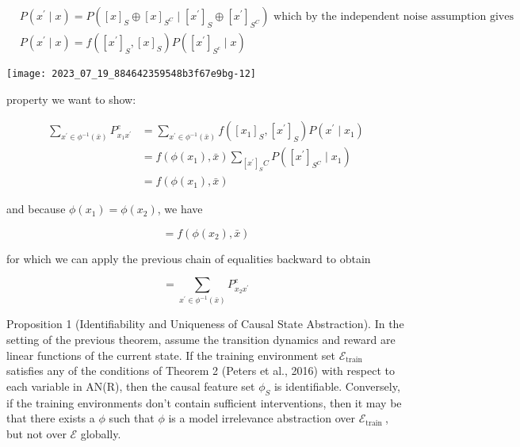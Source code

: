 \documentclass[10pt]{article}
\begin{document}
\[
\begin{aligned}
& P\left(x^{\prime} \mid x\right)=P\left([x]_{S} \oplus[x]_{S^{C}} \mid\left[x^{\prime}\right]_{S} \oplus\left[x^{\prime}\right]_{S^{C}}\right) \text { which by the independent noise assumption gives } \\
& P\left(x^{\prime} \mid x\right)=f\left(\left[x^{\prime}\right]_{S},[x]_{S}\right) P\left(\left[x^{\prime}\right]_{S^{c}} \mid x\right)
\end{aligned}
\]

\begin{center}
\texttt{[image: 2023\_07\_19\_884642359548b3f67e9bg-12]}
\end{center}

property we want to show:

\[
\begin{aligned}
\sum_{x^{\prime} \in \phi^{-1}(\bar{x})} P_{x_{1} x^{\prime}}^{e} & =\sum_{x^{\prime} \in \phi^{-1}(\bar{x})} f\left(\left[x_{1}\right]_{S},\left[x^{\prime}\right]_{S}\right) P\left(x^{\prime} \mid x_{1}\right) \\
& =f\left(\phi\left(x_{1}\right), \bar{x}\right) \sum_{\left[x^{\prime}\right]_{S} C} P\left(\left[x^{\prime}\right]_{S^{C}} \mid x_{1}\right) \\
& =f\left(\phi\left(x_{1}\right), \bar{x}\right)
\end{aligned}
\]

and because $\phi\left(x_{1}\right)=\phi\left(x_{2}\right)$, we have

\[
=f\left(\phi\left(x_{2}\right), \bar{x}\right)
\]

for which we can apply the previous chain of equalities backward to obtain

\[
=\sum_{x^{\prime} \in \phi^{-1}(\bar{x})} P_{x_{2} x^{\prime}}^{e}
\]

Proposition 1 (Identifiability and Uniqueness of Causal State Abstraction). In the setting of the previous theorem, assume the transition dynamics and reward are linear functions of the current state. If the training environment set $\mathcal{E}_{\text {train }}$ satisfies any of the conditions of Theorem 2 (Peters et al., 2016) with respect to each variable in AN(R), then the causal feature set $\phi_{S}$ is identifiable. Conversely, if the training environments don't contain sufficient interventions, then it may be that there exists a $\phi$ such that $\phi$ is a model irrelevance abstraction over $\mathcal{E}_{\text {train }}$, but not over $\mathcal{E}$ globally.
\end{document}
